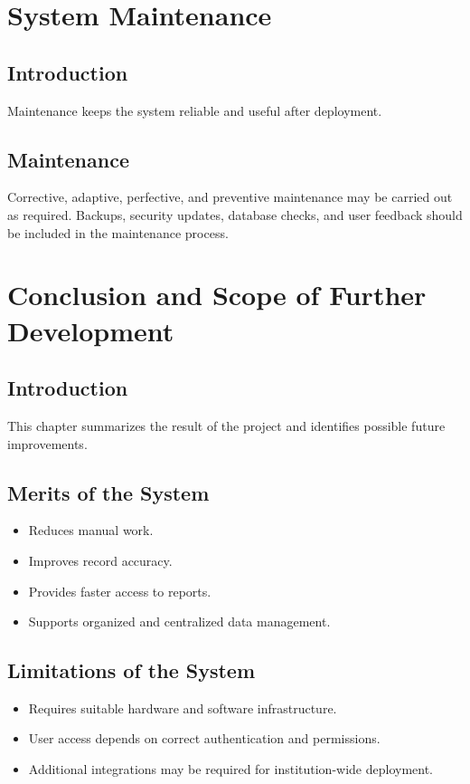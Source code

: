 \documentclass[12pt,a4paper]{report}
\begin{document}
\chapter{System Maintenance}

\section{Introduction}
Maintenance keeps the system reliable and useful after deployment.

\section{Maintenance}
Corrective, adaptive, perfective, and preventive maintenance may be carried out as required. Backups, security updates, database checks, and user feedback should be included in the maintenance process.

\chapter{Conclusion and Scope of Further Development}

\section{Introduction}
This chapter summarizes the result of the project and identifies possible future improvements.

\section{Merits of the System}
\begin{itemize}
  \item Reduces manual work.
  \item Improves record accuracy.
  \item Provides faster access to reports.
  \item Supports organized and centralized data management.
\end{itemize}

\section{Limitations of the System}
\begin{itemize}
  \item Requires suitable hardware and software infrastructure.
  \item User access depends on correct authentication and permissions.
  \item Additional integrations may be required for institution-wide deployment.
\end{itemize}
\end{document}
